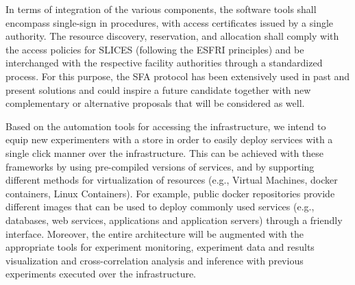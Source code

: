 In terms of integration of the various components, the software tools shall encompass single-sign in procedures, with access certificates issued by a single authority. The resource discovery, reservation, and allocation shall comply with the access policies for SLICES (following the ESFRI principles) and be interchanged with the respective facility authorities through a standardized process. For this purpose, the SFA protocol \cite{sfa} has been extensively used in past and present solutions and  could inspire a future candidate together with new complementary or alternative proposals that will be considered as well. 


Based on the automation tools %
for accessing the infrastructure, 
we intend to equip new experimenters with a store in order to easily deploy services with a single click manner over the infrastructure. This can be achieved with these frameworks by using pre-compiled versions of services, and by supporting different methods for virtualization of resources (e.g., Virtual Machines, docker containers, Linux Containers). For example, public docker repositories provide different images that can be used to deploy commonly used services (e.g., databases, web services, applications and application servers) through a friendly interface. Moreover, the entire architecture will be augmented with the appropriate tools for experiment monitoring, experiment data and results visualization and cross-correlation analysis and inference with previous experiments executed over the infrastructure.

